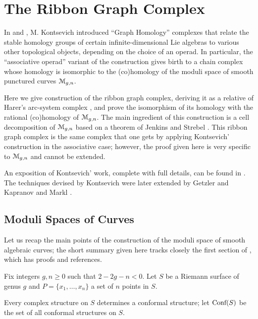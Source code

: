 

\chapter{The Ribbon Graph Complex}
\label{cha:ribbon-graph-complex}

In \cite{kontsevich;feynman} and \cite{kontsevich;1993}, M. Kontsevich
introduced ``Graph Homology'' complexes that relate the stable
homology groups of certain infinite-dimensional Lie algebras to
various other topological objects, depending on the choice of an
operad.  In particular, the ``associative operad'' variant of the
construction gives birth to a chain complex whose homology is
isomorphic to the (co)homology of the moduli space of smooth punctured
curves $\mathcal{M}_{g,n}$.

Here we give construction of the ribbon graph complex, deriving it as
a relative of Harer's arc-system complex
\cite{harer;cohomological-dimension, harer;cohomology-of-moduli}, and
prove the isomorphism of its homology with the rational (co)homology
of $\mathcal{M}_{g,n}$.  The main ingredient of this construction is a cell
decomposition of $\mathcal{M}_{g,n}$ based on a theorem of Jenkins and Strebel
\cite{strebel;quadratic-differentials;1983}.  This ribbon graph
complex is the same complex that one gets by applying Kontsevich'
construction in the associative case; however, the proof given here is
very specific to $\mathcal{M}_{g,n}$ and cannot be extended.

An exposition of Kontsevich' work, complete with full details, can be
found in \cite{conant-vogtmann;2003}.  The techniques devised by
Kontsevich were later extended by Getzler and Kapranov
\cite{getzler-kapranov} and Markl \cite{markl;cyclic}.


\section{Moduli Spaces of Curves}
\label{sec:moduli-spaces}

Let us recap the main points of the construction of the moduli space
of smooth algebraic curves; the short summary given here tracks
closely the first section of \cite{looijenga;cellular-decomposition},
which has proofs and references.

Fix integers $g,n\geq0$ such that $2 -2g - n < 0$. Let $S$ be a Riemann
surface of genus $g$ and $P = \{ x_1, \ldots, x_n \}$ a set of $n$ points
in $S$.

Every complex structure  on $S$ determines a conformal structure; let
$\text{\rm Conf}(S)$ be the set of all conformal structures on $S$. 

